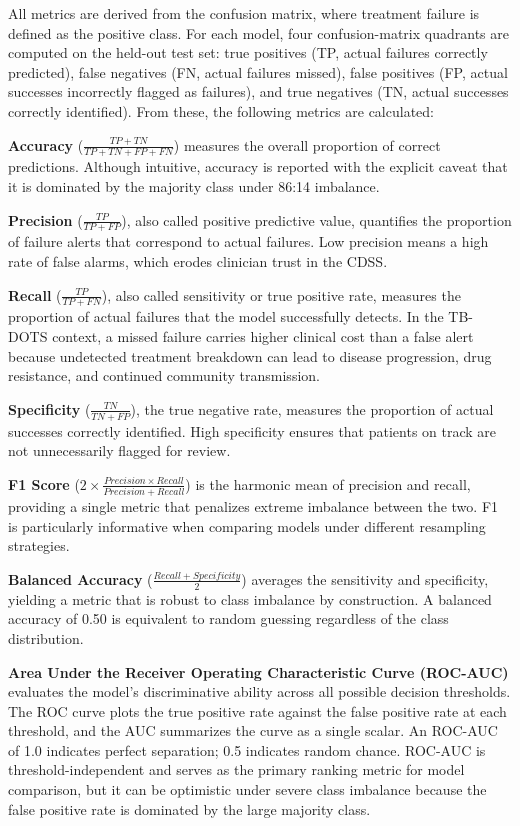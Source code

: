 \documentclass[12pt]{article}
\begin{document}
All metrics are derived from the confusion matrix, where treatment failure is defined as the positive class. For each model, four confusion-matrix quadrants are computed on the held-out test set: true positives (TP, actual failures correctly predicted), false negatives (FN, actual failures missed), false positives (FP, actual successes incorrectly flagged as failures), and true negatives (TN, actual successes correctly identified). From these, the following metrics are calculated:

\textbf{Accuracy} ($\frac{TP + TN}{TP + TN + FP + FN}$) measures the overall proportion of correct predictions. Although intuitive, accuracy is reported with the explicit caveat that it is dominated by the majority class under 86:14 imbalance.

\textbf{Precision} ($\frac{TP}{TP + FP}$), also called positive predictive value, quantifies the proportion of failure alerts that correspond to actual failures. Low precision means a high rate of false alarms, which erodes clinician trust in the CDSS.

\textbf{Recall} ($\frac{TP}{TP + FN}$), also called sensitivity or true positive rate, measures the proportion of actual failures that the model successfully detects. In the TB-DOTS context, a missed failure carries higher clinical cost than a false alert because undetected treatment breakdown can lead to disease progression, drug resistance, and continued community transmission.

\textbf{Specificity} ($\frac{TN}{TN + FP}$), the true negative rate, measures the proportion of actual successes correctly identified. High specificity ensures that patients on track are not unnecessarily flagged for review.

\textbf{F1 Score} ($2 \times \frac{Precision \times Recall}{Precision + Recall}$) is the harmonic mean of precision and recall, providing a single metric that penalizes extreme imbalance between the two. F1 is particularly informative when comparing models under different resampling strategies.

\textbf{Balanced Accuracy} ($\frac{Recall + Specificity}{2}$) averages the sensitivity and specificity, yielding a metric that is robust to class imbalance by construction. A balanced accuracy of 0.50 is equivalent to random guessing regardless of the class distribution.

\textbf{Area Under the Receiver Operating Characteristic Curve (ROC-AUC)} evaluates the model's discriminative ability across all possible decision thresholds. The ROC curve plots the true positive rate against the false positive rate at each threshold, and the AUC summarizes the curve as a single scalar. An ROC-AUC of 1.0 indicates perfect separation; 0.5 indicates random chance. ROC-AUC is threshold-independent and serves as the primary ranking metric for model comparison, but it can be optimistic under severe class imbalance because the false positive rate is dominated by the large majority class.
\end{document}
